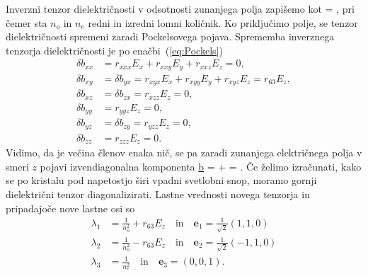 Inverzni tenzor dielektričnosti v odsotnosti zunanjega polja zapišemo kot
\beq
\underline{} = 
,
\label{7.8}
\eeq
pri čemer sta $n_o$ in $n_e$ redni in izredni lomni količnik. Ko priključimo 
polje, se tenzor dielektričnosti spremeni zaradi Pockelsovega pojava. Sprememba
inverznega tenzorja dielektričnosti je po enačbi~(\ref{eq:Pockels})
\begin{align}
\delta b_{xx} & =r_{xxx}E_x + r_{xxy}E_y + r_{xxz}E_z = 0,\nonumber \\
\delta b_{xy} & = \delta b_{yx} = r_{xyx}E_x + r_{xyy}E_y + r_{xyz}E_z = r_{63}E_z,\nonumber\\
\delta b_{xz} & = \delta b_{zx} =r_{xzz}E_z = 0,\nonumber\\
\delta b_{yy} & =r_{yyz}E_z = 0,\nonumber\\
\delta b_{yz} & = \delta b_{zy} =r_{yzz}E_z = 0,\nonumber\\
\delta b_{zz} & =r_{zzz}E_z = 0.
\end{align}
Vidimo, da je večina členov enaka nič, se pa zaradi zunanjega električnega
polja v smeri $z$ pojavi izvendiagonalna komponenta 
\beq
\underline{b} = 
 +  = .
\label{7.8a}
\eeq
Če želimo izračunati, kako se po kristalu pod napetostjo širi vpadni svetlobni
snop, moramo gornji dielektrični tenzor diagonalizirati. Lastne vrednosti novega tenzorja
in pripadajoče nove lastne osi so
\begin{align}
\lambda_1 &= \frac{1}{n_o^2}+ r_{63}E_z \quad \mathrm{in} \quad \mathbf{e}_1 = \frac{1}{\sqrt{2}}(1,1,0)\\
\lambda_2 &= \frac{1}{n_o^2}- r_{63}E_z \quad \mathrm{in} \quad \mathbf{e}_2 = \frac{1}{\sqrt{2}}(-1,1,0)\\
\lambda_3 &= \frac{1}{n_e^2} \quad \mathrm{in} \quad \mathbf{e}_3 = (0,0,1).
\end{align}
